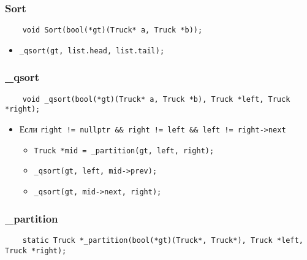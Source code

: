 \subsubsection*{Sort}

\begin{lstlisting}
    void Sort(bool(*gt)(Truck* a, Truck *b));
\end{lstlisting}

\begin{itemize}
        \item \verb|_qsort(gt, list.head, list.tail);|
\end{itemize}



\subsubsection*{_qsort}

\begin{lstlisting}
    void _qsort(bool(*gt)(Truck* a, Truck *b), Truck *left, Truck *right);
\end{lstlisting}

\begin{itemize}
	\item Если \verb|right != nullptr && right != left && left != right->next|
		\begin{itemize}
			\item \verb|Truck *mid = _partition(gt, left, right);|
			\item \verb|_qsort(gt, left, mid->prev);|
			\item \verb|_qsort(gt, mid->next, right);|
		\end{itemize}
\end{itemize}



\subsubsection*{_partition}

\begin{lstlisting}
    static Truck *_partition(bool(*gt)(Truck*, Truck*), Truck *left, Truck *right);
\end{lstlisting}

